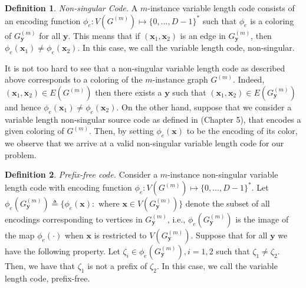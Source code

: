 \documentclass[journal, onecolumn, draftcls]{IEEEtran}
\theoremstyle{definition}
\newtheorem{definition}{Definition}
\newcommand{\bfy}{\mathbf{y}}
\newcommand{\bfX}{\mathbf{X}}
\newcommand{\bfY}{\mathbf{Y}}
\newcommand{\bfx}{\mathbf{x}}
\newcommand{\bbN}{\mathbb{N}}
\newcommand{\meng}[1]{\marginpar{+}{\bf Ruoyu's remark}: {\em #1}}
\newcommand{\aditya}[1]{\marginpar{+}{\bf Aditya's remark}: {\em #1}}
\begin{document}






\begin{definition}{\it Non-singular Code.} \label{def:ns_code}
A $m$-instance variable length code consists of an encoding function $\phi_{e}:V(G^{(m)}) \mapsto \{0,\dots, D-1\}^*$ such that $\phi_e$ is a coloring of $G^{(m)}_\bfy$ for all $\bfy$. This means that if $(\bfx_1,\bfx_2)$ is an edge in $G^{(m)}_\bfy$, then $\phi_{e}(\bfx_1) \neq \phi_{e}(\bfx_2)$. In this case, we call the variable length code, non-singular.
\end{definition} 

It is not too hard to see that a non-singular variable length code as described above corresponds to a coloring of the $m$-instance graph $G^{(m)}$. Indeed, $(\bfx_1, \bfx_2) \in E(G^{(m)})$ then there exists a $\bfy$ such that $(\bfx_1, \bfx_2) \in E(G^{(m)}_\bfy)$ and hence $\phi_e(\bfx_1) \neq \phi_e(\bfx_2)$. On the other hand, suppose that we consider a variable length non-singular source code as defined in \cite{CoverT05} (Chapter 5), that encodes a given coloring of $G^{(m)}$. Then, by setting $\phi_e(\bfx)$ to be the encoding of its color, we observe that we arrive at a valid non-singular variable length code for our problem. 

\begin{definition}{\it Prefix-free code.} \label{def:pf_code}
Consider a $m$-instance non-singular variable length code with encoding function $\phi_e: V(G^{(m)}) \mapsto \{0, \dots, D-1\}^*$.
Let $\phi_e(G^{(m)}_\bfy) \triangleq \{\phi_e(\bfx):\text{~where~} \bfx \in V( G^{(m)}_\bfy)\}$ denote the subset of all encodings corresponding to vertices in $G^{(m)}_\bfy$, i.e., $\phi_e(G^{(m)}_\bfy)$ is the image of the map $\phi_e(\cdot)$ when $\bfx$ is restricted to $V( G^{(m)}_\bfy)$. Suppose that for all $\bfy$ we have the following property. Let $\zeta_i \in \phi_e(G^{(m)}_\bfy), i =1,2$ such that $\zeta_1 \neq \zeta_2$. Then, we have that $\zeta_1$ is not a prefix of $\zeta_2$. In this case, we call the variable length code, prefix-free. 
\end{definition}  %
\end{document}
